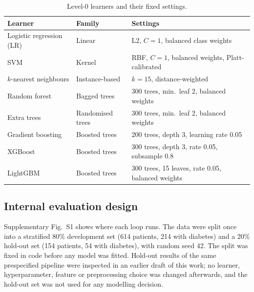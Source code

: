 \documentclass[preprint,12pt,authoryear=false]{elsarticle}
\begin{document}
\begin{table}[!htbp]
\centering
\caption{Level-0 learners and their fixed settings.}
\label{tab:learners}
\small
\begin{tabularx}{\linewidth}{llL}
\toprule
Learner & Family & Settings \\
\midrule
Logistic regression (LR) & Linear & L2, $C=1$, balanced class weights \\
SVM & Kernel & RBF, $C=1$, balanced weights, Platt-calibrated~\cite{platt1999} \\
$k$-nearest neighbours & Instance-based & $k=15$, distance-weighted \\
Random forest~\cite{breiman2001rf} & Bagged trees & 300 trees, min.\ leaf 2, balanced weights \\
Extra trees & Randomised trees & 300 trees, min.\ leaf 2, balanced weights \\
Gradient boosting & Boosted trees & 200 trees, depth 3, learning rate 0.05 \\
XGBoost~\cite{chen2016xgboost} & Boosted trees & 300 trees, depth 3, rate 0.05, subsample 0.8 \\
LightGBM~\cite{ke2017lightgbm} & Boosted trees & 300 trees, 15 leaves, rate 0.05, balanced weights \\
\bottomrule
\end{tabularx}
\end{table}

\subsection{Internal evaluation design}
Supplementary Fig.~S1 shows where each loop runs. The data were split once into a stratified 80\% development set (614 patients, 214 with diabetes) and a 20\% hold-out set (154 patients, 54 with diabetes), with random seed 42. The split was fixed in code before any model was fitted. Hold-out results of the same prespecified pipeline were inspected in an earlier draft of this work; no learner, hyperparameter, feature or preprocessing choice was changed afterwards, and the hold-out set was not used for any modelling decision.
\end{document}
